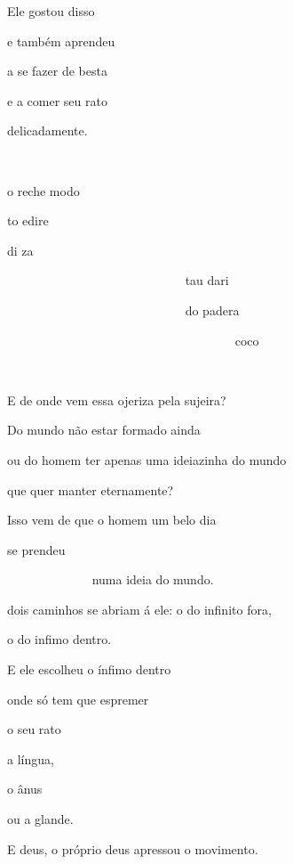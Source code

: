 
Ele gostou disso

e também aprendeu

a se fazer de besta

e a comer seu rato

delicadamente.




~

o reche modo

to edire

di za

~~~~~~~~~~~~~~~~~~~~~~~~~~~~ tau dari

~~~~~~~~~~~~~~~~~~~~~~~~~~~~ do padera

~~~~~~~~~~~~~~~~~~~~~~~~~~~ ~~~~~~~~~coco~~~~

~



E de onde vem essa ojeriza pela sujeira?

Do mundo não estar formado ainda

ou do homem ter apenas uma ideiazinha do mundo

que quer manter eternamente?

Isso vem de que o homem um belo dia


se prendeu

~~~~~~~~~~~~~ numa ideia do mundo.

dois caminhos se abriam á ele: o do infinito fora, 

o do infimo dentro.

E ele escolheu o ínfimo dentro

onde só tem que espremer


o seu rato

a língua, 

o ânus

ou a glande.

E deus, o próprio deus apressou o movimento.

